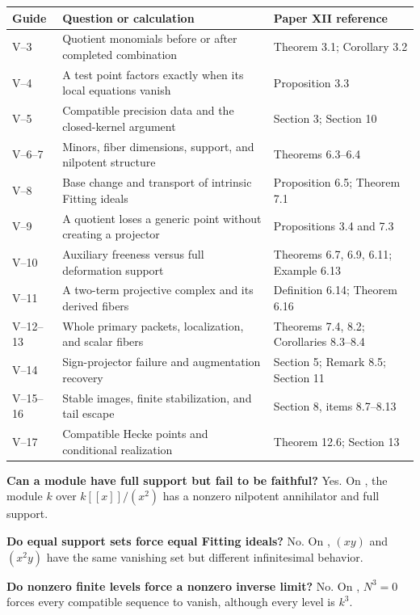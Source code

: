 {\small
\begin{tabularx}{\linewidth}{@{}p{.12\linewidth}Yp{.30\linewidth}@{}}\toprule
\textbf{Guide} & \textbf{Question or calculation} & \textbf{Paper XII reference}\\\midrule
V--3 & Quotient monomials before or after completed combination & Theorem 3.1; Corollary 3.2\\
V--4 & A test point factors exactly when its local equations vanish & Proposition 3.3\\
V--5 & Compatible precision data and the closed-kernel argument & Section 3; Section 10\\
V--6--7 & Minors, fiber dimensions, support, and nilpotent structure & Theorems 6.3--6.4\\
V--8 & Base change and transport of intrinsic Fitting ideals & Proposition 6.5; Theorem 7.1\\
V--9 & A quotient loses a generic point without creating a projector & Propositions 3.4 and 7.3\\
V--10 & Auxiliary freeness versus full deformation support & Theorems 6.7, 6.9, 6.11; Example 6.13\\
V--11 & A two-term projective complex and its derived fibers & Definition 6.14; Theorem 6.16\\
V--12--13 & Whole primary packets, localization, and scalar fibers & Theorems 7.4, 8.2; Corollaries 8.3--8.4\\
V--14 & Sign-projector failure and augmentation recovery & Section 5; Remark 8.5; Section 11\\
V--15--16 & Stable images, finite stabilization, and tail escape & Section 8, items 8.7--8.13\\
V--17 & Compatible Hecke points and conditional realization & Theorem 12.6; Section 13\\\bottomrule
\end{tabularx}}

\textbf{Can a module have full support but fail to be faithful?} Yes. On , the module $k$ over $k[[x]]/(x^2)$ has a nonzero nilpotent annihilator and full support.

\textbf{Do equal support sets force equal Fitting ideals?} No. On , $(xy)$ and $(x^2y)$ have the same vanishing set but different infinitesimal behavior.

\textbf{Do nonzero finite levels force a nonzero inverse limit?} No. On , $N^3=0$ forces every compatible sequence to vanish, although every level is $k^3$.

